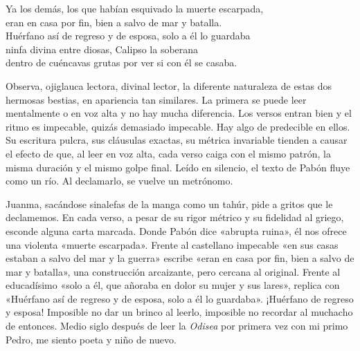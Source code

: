 \begin{versocita}
Ya los demás, los que habían esquivado la muerte escarpada,\\
eran en casa por fin, bien a salvo de mar y batalla.\\
Huérfano así de regreso y de esposa, solo a él lo guardaba\\
ninfa divina entre diosas, Calipso la soberana\\
dentro de cuéncavas grutas por ver si con él se casaba.
\end{versocita}

Observa, ojiglauca lectora, divinal lector, la diferente naturaleza de estas dos hermosas bestias, en apariencia tan similares. La primera se puede leer mentalmente o en voz alta y no hay mucha diferencia. Los versos entran bien y el ritmo es impecable, quizás demasiado impecable. Hay algo de predecible en ellos. Su escritura pulcra, sus cláusulas exactas, su métrica invariable tienden a causar el efecto de que, al leer en voz alta, cada verso caiga con el mismo patrón, la misma duración y el mismo golpe final. Leído en silencio, el texto de Pabón fluye como un río. Al declamarlo, se vuelve un metrónomo.

Juanma, sacándose sinalefas de la manga como un tahúr, pide a gritos que le declamemos. En cada verso, a pesar de su rigor métrico y su fidelidad al griego, esconde alguna carta marcada. Donde Pabón dice «abrupta ruina», él nos ofrece una violenta «muerte escarpada». Frente al castellano impecable «en sus casas estaban a salvo del mar y la guerra» escribe «eran en casa por fin, bien a salvo de mar y batalla», una construcción arcaizante, pero cercana al original. Frente al educadísimo «solo a él, que añoraba en dolor su mujer y sus lares», replica con «Huérfano así de regreso y de esposa, solo a él lo guardaba». ¡Huérfano de regreso y esposa! Imposible no dar un brinco al leerlo, imposible no recordar al muchacho de entonces. Medio siglo después de leer la \emph{Odisea} por primera vez con mi primo Pedro, me siento poeta y niño de nuevo.
